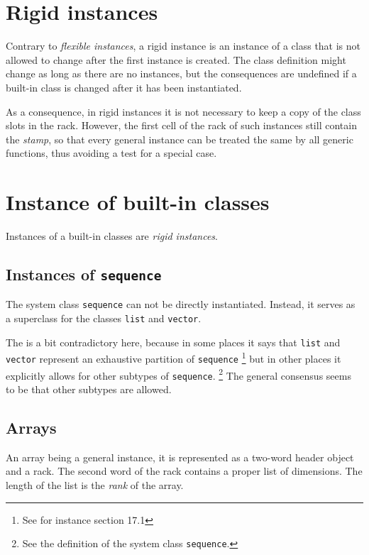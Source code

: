 \section{Rigid instances}
\label{sec-data-representation-rigid-instances}

Contrary to \emph{flexible instances}, a rigid instance is an instance
of a class that is not allowed to change after the first instance is
created.  The class definition might change as long as there are
no instances, but the consequences are undefined if a built-in class
is changed after it has been instantiated.

As a consequence, in rigid instances it is not necessary to keep a
copy of the class slots in the rack.  However, the first
cell of the rack of such instances still contain the
\emph{stamp}, so that every general instance can be treated the same
by all generic functions, thus avoiding a test for a special case.

\section{Instance of built-in classes}

Instances of a built-in classes are \emph{rigid instances}. 

\subsection{Instances of \texttt{sequence}}

The system class \texttt{sequence} can not be directly instantiated.
Instead, it serves as a superclass for the classes \texttt{list} and
\texttt{vector}.  

The \hs{} is a bit contradictory here, because
in some places it says that \texttt{list} and \texttt{vector}
represent an exhaustive partition of \texttt{sequence}%
\footnote{See for instance section 17.1}
but in other places it explicitly allows for other subtypes of
\texttt{sequence}.%
\footnote{See the definition of the system class \texttt{sequence}.}
The general consensus seems to be that other subtypes are allowed. 


\subsection{Arrays}
\label{sec-data-representation-arrays}

An array being a general instance, it is represented as a two-word
header object and a rack.  The second word of the rack
contains a proper list of dimensions.  The length of the list
is the \emph{rank} of the array.


